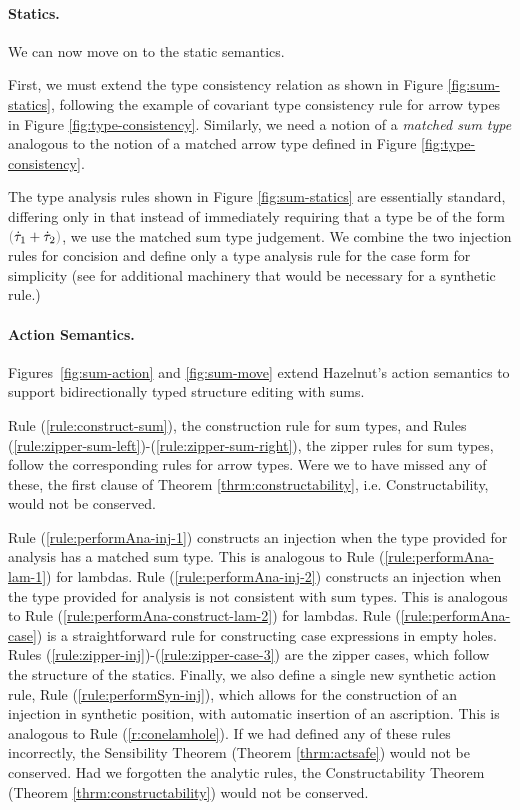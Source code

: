 \paragraph{Statics.}
We can now move on to the static semantics.

First, we must extend the type consistency relation as shown in
Figure \ref{fig:sum-statics}, following the example of covariant type
consistency rule for arrow types in
Figure \ref{fig:type-consistency}. Similarly, we need a notion of
a \emph{matched sum type} analogous to the notion of a matched
arrow type defined in Figure \ref{fig:type-consistency}.

The type analysis rules shown in Figure \ref{fig:sum-statics} are
essentially standard, differing only in that instead of immediately
requiring that a type be of the form $\tsum{\htau_1}{\htau_2}$, we use the
matched sum type judgement. We combine the two injection rules for
concision and define only a type analysis rule for the case form for
simplicity (see \cite{DBLP:conf/popl/CiminiS16} for additional machinery
that would be necessary for a synthetic rule.)


\paragraph{Action Semantics.}
Figures~\ref{fig:sum-action} and \ref{fig:sum-move} extend Hazelnut's
action semantics to support bidirectionally typed structure editing with sums.
%

Rule (\ref{rule:construct-sum}), the construction rule for sum types, and
Rules (\ref{rule:zipper-sum-left})-(\ref{rule:zipper-sum-right}), the
zipper rules for sum types, follow the corresponding rules for arrow
types. Were we to have missed any of these, the first clause of
Theorem \ref{thrm:constructability}, i.e. Constructability, would not be
conserved.

Rule (\ref{rule:performAna-inj-1}) constructs an injection when the type
provided for analysis has a matched sum type. This is analogous to Rule
(\ref{rule:performAna-lam-1}) for lambdas. Rule
(\ref{rule:performAna-inj-2}) constructs an injection when the type
provided for analysis is not consistent with sum types. This is analogous
to Rule (\ref{rule:performAna-construct-lam-2}) for lambdas. Rule
(\ref{rule:performAna-case}) is a straightforward rule for constructing
case expressions in empty holes. Rules
(\ref{rule:zipper-inj})-(\ref{rule:zipper-case-3}) are the zipper cases,
which follow the structure of the statics. Finally, we also define a single
new synthetic action rule, Rule (\ref{rule:performSyn-inj}), which allows
for the construction of an injection in synthetic position, with automatic
insertion of an ascription. This is analogous to Rule
(\ref{r:conelamhole}). If we had defined any of these rules incorrectly,
the Sensibility Theorem (Theorem \ref{thrm:actsafe}) would not be
conserved. Had we forgotten the analytic rules, the Constructability
Theorem (Theorem \ref{thrm:constructability}) would not be conserved.

